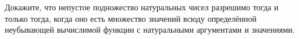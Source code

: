 Докажите, что непустое подножество натуральных чисел разрешимо тогда и только тогда, когда оно есть
множество значений всюду определённой неубывающей вычислимой функции с натуральными аргументами и
значениями.
